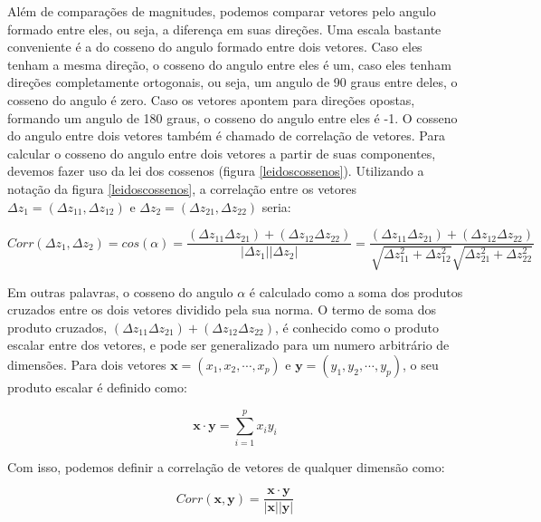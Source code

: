 \documentclass[portuges,]{tufte-handout}
\begin{document}
Além de comparações de magnitudes, podemos comparar vetores pelo angulo
formado entre eles, ou seja, a diferença em suas direções. Uma escala
bastante conveniente é a do cosseno do angulo formado entre dois
vetores. Caso eles tenham a mesma direção, o cosseno do angulo entre
eles é um, caso eles tenham direções completamente ortogonais, ou seja,
um angulo de 90 graus entre deles, o cosseno do angulo é zero. Caso os
vetores apontem para direções opostas, formando um angulo de 180 graus,
o cosseno do angulo entre eles é -1. O cosseno do angulo entre dois
vetores também é chamado de correlação de vetores. Para calcular o
cosseno do angulo entre dois vetores a partir de suas componentes,
devemos fazer uso da lei dos cossenos (figura \ref{leidoscossenos}).
Utilizando a notação da figura \ref{leidoscossenos}, a correlação entre
os vetores $\Delta z_1 = (\Delta z_{11}, \Delta z_{12})$ e
$\Delta z_2 = (\Delta z_{21}, \Delta z_{22})$ seria:

\[
Corr(\Delta z_1, \Delta z_2) = cos(\alpha) = \frac{(\Delta z_{11}  \Delta z_{21}) + (\Delta z_{12}  \Delta z_{22})}{| \Delta z_1|  | \Delta z_2|} = \frac{(\Delta z_{11}  \Delta z_{21}) + (\Delta z_{12}  \Delta z_{22})}{\sqrt{\Delta z_{11}^2 + \Delta z_{12}^2}  \sqrt{\Delta z_{21}^2 + \Delta z_{22}^2}}
\]

Em outras palavras, o cosseno do angulo $\alpha$ é calculado como a soma
dos produtos cruzados entre os dois vetores dividido pela sua norma. O
termo de soma dos produto cruzados,
$(\Delta z_{11} \Delta z_{21}) + (\Delta z_{12} \Delta z_{22})$, é
conhecido como o produto escalar entre dos vetores, e pode ser
generalizado para um numero arbitrário de dimensões. Para dois vetores
$\mathbf{x} = (x_1, x_2, \cdots, x_p)$ e
$\mathbf{y} = (y_1, y_2, \cdots, y_p)$, o seu produto escalar é definido
como:

\[
\mathbf{x} \cdot \mathbf{y} = \sum_{i=1}^p x_iy_i
\]

Com isso, podemos definir a correlação de vetores de qualquer dimensão
como:

\[
Corr(\mathbf{x}, \mathbf{y}) = \frac{\mathbf{x} \cdot \mathbf{y}}{|\mathbf{x}||\mathbf{y}|}
\]
\end{document}
